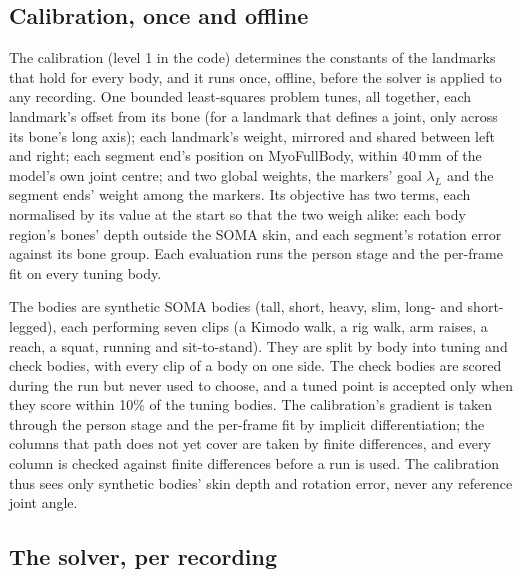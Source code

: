 \documentclass[11pt]{article}
\begin{document}
\subsection{Calibration, once and offline}
\label{sec:calibration}

The calibration (level 1 in the code) determines the constants of the landmarks that hold for every body, and it runs
once, offline, before the solver is applied to any recording. One bounded least-squares problem tunes, all together,
each landmark's offset from its bone (for a landmark that defines a joint, only across its bone's long axis); each landmark's
weight, mirrored and shared between left and right; each segment end's position on MyoFullBody, within 40\,mm of the
model's own joint centre; and two global weights, the markers' goal $\lambda_L$ and the segment ends' weight among the
markers. Its objective has two terms, each normalised by its value at the start so that the two weigh alike: each body
region's bones' depth outside the SOMA skin, and each segment's rotation error against its bone group. Each evaluation
runs the person stage and the per-frame fit on every tuning body.

The bodies are synthetic SOMA bodies (tall, short, heavy, slim, long- and short-legged), each performing seven clips (a
Kimodo walk, a rig walk, arm raises, a reach, a squat, running and sit-to-stand). They are split by body into tuning
and check bodies, with every clip of a body on one side. The check bodies are scored during the run but never used to
choose, and a tuned point is accepted only when they score within 10\% of the tuning bodies. The calibration's
gradient is taken through the person stage and the per-frame fit by implicit differentiation; the columns that path
does not yet cover are taken by finite differences, and every column is checked against finite differences before a
run is used. The calibration thus sees only synthetic bodies' skin depth and rotation error, never any reference joint
angle.

\subsection{The solver, per recording}
\end{document}
